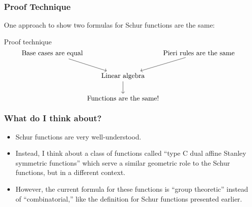 \documentclass{beamer}
\begin{document}
\begin{frame}[fragile]
  \frametitle{Proof Technique}
  One approach to show two formulas for Schur functions are the same:
  \begin{block}{Proof technique}
    \[
      \begin{tikzcd}[cramped, column sep=0.01em]
        \text{Base cases are equal} \ar[rd]&\, & \ar[ld] \text{Pieri rules are the same}\\
        \ &\text{Linear algebra} \ar[d] & \ \\
        \ &\text{Functions are the same!} & \
      \end{tikzcd}
    \]
  \end{block}
\end{frame}
\begin{frame}
  \frametitle{What do I think about?}
  \begin{itemize}
  \item Schur functions are very well-understood.\pause
  \item Instead, I think about a class of functions called ``type C
    dual affine Stanley symmetric functions'' which serve a similar
    geometric role to the Schur functions, but in a different context.\pause
  \item However, the current formula for these functions is ``group
    theoretic'' instead of ``combinatorial,'' like the definition for
    Schur functions presented earlier.
  \end{itemize}
\end{frame}
\end{document}
